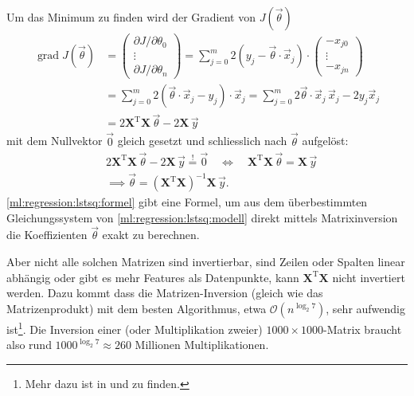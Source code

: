 Um das Minimum zu finden wird der Gradient von $J(\vec \theta)$ 
\begin{align}
    \operatorname{grad} J(\vec \theta) &=
    \begin{pmatrix} \partial J / \partial \theta_0 \\ \vdots \\ \partial J / \partial \theta_n \end{pmatrix}
    = \sum_{j = 0}^{m} 2 (y_j - \vec \theta \cdot \vec x_j) \cdot
    \begin{pmatrix} - x_{j0}\\ \vdots \\ - x_{jn} \end{pmatrix} \nonumber\\
    &= \sum_{j = 0}^{m} 2 \left( \vec \theta \cdot \vec x_j - y_j \right) \cdot \vec x_j
    = \sum_{j = 0}^{m} 2 \vec \theta \cdot \vec x_j\, \vec x_j - 2 y_j \vec x_j \nonumber\\
    &= 2 \mathbf{X}^\mathrm{T} \mathbf{X}\, \vec \theta - 2 \mathbf{X}\, \vec y
    \label{ml:regression:lstsq:grad}
\end{align}
mit dem Nullvektor $\vec 0$ gleich gesetzt
und schliesslich nach $\vec \theta$ aufgelöst:
\begin{align}
    &2\mathbf{X}^\mathrm{T} \mathbf{X}\, \vec \theta - 2 \mathbf{X}\, \vec y \overset{!}= \vec 0 \quad\Leftrightarrow\quad
    \mathbf{X}^\mathrm{T} \mathbf{X}\, \vec \theta = \mathbf{X}\, \vec y \nonumber\\
    &\implies \vec \theta = \left( \mathbf{X}^\mathrm{T} \mathbf{X} \right)^{-1} \mathbf{X} \, \vec y.
    \label{ml:regression:lstsq:formel}
\end{align}
\eqref{ml:regression:lstsq:formel} gibt eine Formel, um aus dem überbestimmten
Gleichungssystem von \eqref{ml:regression:lstsq:modell} direkt mittels Matrixinversion
die Koeffizienten $\vec \theta$ exakt zu berechnen.

\bigskip
Aber nicht alle solchen Matrizen sind invertierbar, sind Zeilen oder Spalten linear
abhängig oder gibt es mehr Features als Datenpunkte, kann $\mathbf{X}^\mathrm{T}\mathbf{X}$
nicht invertiert werden.
Dazu kommt dass die Matrizen-Inversion (gleich wie das Matrizenprodukt) mit dem besten
Algorithmus, etwa $\mathcal{O}(n^{\log_2 7})$, sehr aufwendig ist\footnote{Mehr dazu ist
in \cite{ml:computational-complexity-math-op} und
\cite{ml:computational-complexity-matrix-mult} zu finden.}. Die Inversion  einer (oder
Multiplikation zweier) $1000 \times 1000$-Matrix braucht also rund $1000^{\log_2 7}
\approx 260$ Millionen Multiplikationen.

